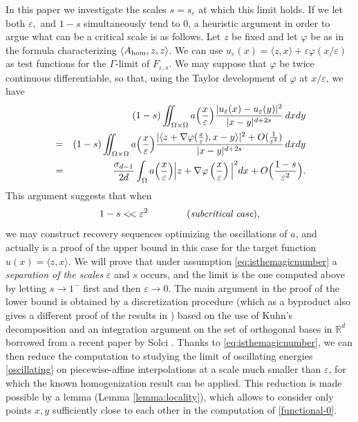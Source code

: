 \documentclass[11pt,a4paper,reqno]{amsart}
\theoremstyle{plain}
\theoremstyle{definition}
\newcommand\e{\varepsilon}
\theoremstyle{remark}
\begin{document}
In this paper we investigate the scales $s=s_\e$ at which this limit holds.
If we let both $\e,$ and $1-s$ simultaneously tend to $0$, a heuristic argument in order to argue what can be a critical scale is as follows. 
Let $z$ be fixed and let $\varphi$ be as in the  formula characterizing $\langle A_{\rm hom},z,z\rangle$.
We can use $u_\e(x)= \langle z,x\rangle+\e\varphi(x/\e)$ as test functions for the $\Gamma$-limit of $F_{\e,s}$.
We may suppose that $\varphi$ be twice continuous differentiable, so that, using the Taylor development of $\varphi$ at $x/\e$, we have
\begin{eqnarray*}
&&\hskip-2cm (1-s)\iint_{\Omega\times\Omega} a\Bigl(\frac{x}{\e}\Bigr)\frac{|u_\e(x)-u_\e(y)|^2}{|x-y|^{d+2s}}\,dxdy
\\
&=&(1-s)\iint_{\Omega\times\Omega} a\Bigl(\frac{x}{\e}\Bigr)\frac{|\langle z+\nabla\varphi(\frac{x}{\e}),x-y\rangle|^2+ O(\frac{1}{\e^2})}{|x-y|^{d+2s}}\,dxdy 
\\
&=& \frac{\sigma_{d-1}}{2d}\int_\Omega a\Bigl(\frac{x}{\e}\Bigr) \Big|z+\nabla\varphi\left(\frac{x}{\e}\right)\Big|^2dx + O\Big(\frac{1-s}{\e^2}\Big).
\end{eqnarray*}
This argument suggests that when
\begin{equation}\label{eq:isthemagicnumber}
1-s<\!< \e^2\qquad\qquad\hbox{({\em subcritical case})},
\end{equation}
 we may construct recovery sequences optimizing the oscillations of $a$, and actually is a proof of the upper bound in this case for the target function $u(x)=\langle z,x\rangle$. We will prove that under assumption \eqref{eq:isthemagicnumber} a {\em separation of the scales} $\e$ and $s$ occurs, and the limit is the one computed above by letting $s\to 1^-$ first and then $\e\to0$. The main argument in the proof of the lower bound is obtained by a discretization procedure (which as a byproduct also gives a different proof of the results in \cite{Ponce}) based on the use of Kuhn's decomposition \cite{Kuhn1960} and an integration argument on the set of orthogonal bases in $\mathbb R^d$ borrowed from a recent paper by Solci \cite{solci2023}.
 Thanks to \eqref{eq:isthemagicnumber}, we can then reduce the computation to studying the limit of oscillating energies \eqref{oscillating} on piecewise-affine interpolations at a scale much smaller than $\e$, for which the known homogenization result can be applied. This reduction is made possible by  a lemma (Lemma \ref{lemma:locality}), which allows to consider only points $x,y$ sufficiently close to each other in the computation of \eqref{functional-0}.
\end{document}
